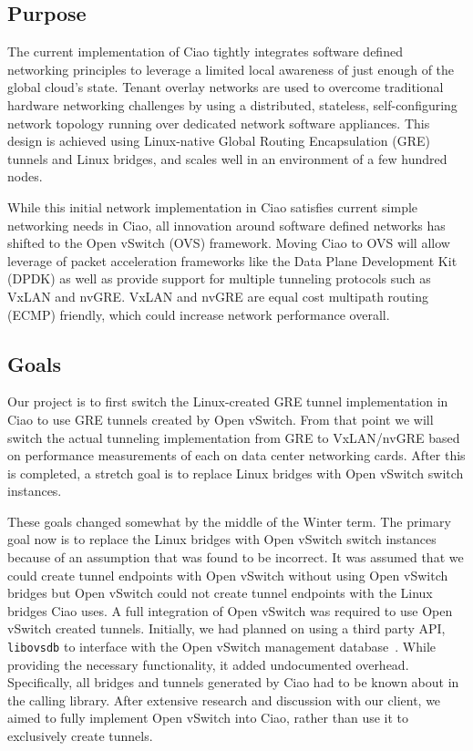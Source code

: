 \documentclass[10pt,onecolumn,journal,draftclsnofoot]{IEEEtran}
\begin{document}
\subsection{Purpose}
The current implementation of Ciao tightly integrates software defined
networking principles to leverage a limited local awareness of just enough of
the global cloud's state. Tenant overlay networks are used to overcome
traditional hardware networking challenges by using a distributed, stateless,
self-configuring network topology running over dedicated network software
appliances. This design is achieved using Linux-native Global Routing
Encapsulation (GRE) tunnels and Linux bridges, and scales well in an environment
of a few hundred nodes.

While this initial network implementation in Ciao satisfies current simple
networking needs in Ciao, all innovation around software defined networks has
shifted to the Open vSwitch (OVS) framework. Moving Ciao to OVS will allow
leverage of packet acceleration frameworks like the Data Plane Development Kit
(DPDK) as well as provide support for multiple tunneling protocols such as VxLAN
and nvGRE. VxLAN and nvGRE are equal cost multipath routing (ECMP) friendly,
which could increase network performance overall.

\subsection{Goals}
Our project is to first switch the Linux-created GRE tunnel implementation in
Ciao to use GRE tunnels created by Open vSwitch. From that point we will switch
the actual tunneling implementation from GRE to VxLAN/nvGRE based on performance
measurements of each on data center networking cards. After this is completed, a
stretch goal is to replace Linux bridges with Open vSwitch switch instances.

These goals changed somewhat by the middle of the Winter term. The primary goal
now is to replace the Linux bridges with Open vSwitch switch instances because
of an assumption that was found to be incorrect. It was assumed that we could 
create tunnel endpoints with Open vSwitch without using Open vSwitch bridges 
but Open vSwitch could not create tunnel endpoints with the Linux bridges 
Ciao uses. A full
integration of Open vSwitch was required to use Open vSwitch created tunnels. 
Initially, we had planned on using
a third party API, \texttt{libovsdb} to interface with the Open vSwitch
management database~\cite{libovsdb}. While providing the necessary
functionality, it added undocumented overhead. Specifically, all bridges and
tunnels generated by Ciao had to be known about in the calling library. After
extensive research and discussion with our client, we aimed to fully implement
Open vSwitch into Ciao, rather than use it to exclusively create tunnels.
\end{document}

